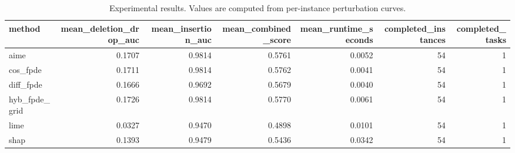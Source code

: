 \begin{table}[t]
\caption{Experimental results. Values are computed from per-instance perturbation curves.}
\label{tab:main_results_computed}
\centering
\begin{tabular}{lrrrrrr}
\toprule
method & mean\_deletion\_drop\_auc & mean\_insertion\_auc & mean\_combined\_score & mean\_runtime\_seconds & completed\_instances & completed\_tasks \\
\midrule
aime & 0.1707 & 0.9814 & 0.5761 & 0.0052 & 54 & 1 \\
cos\_fpde & 0.1711 & 0.9814 & 0.5762 & 0.0041 & 54 & 1 \\
diff\_fpde & 0.1666 & 0.9692 & 0.5679 & 0.0040 & 54 & 1 \\
hyb\_fpde\_grid & 0.1726 & 0.9814 & 0.5770 & 0.0061 & 54 & 1 \\
lime & 0.0327 & 0.9470 & 0.4898 & 0.0101 & 54 & 1 \\
shap & 0.1393 & 0.9479 & 0.5436 & 0.0342 & 54 & 1 \\
\bottomrule
\end{tabular}

\end{table}
